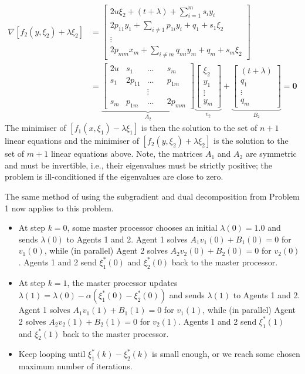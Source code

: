 \documentclass[12pt]{article}
\begin{document}
\begin{align*}
\nabla [f_2(y,\xi_2)+\lambda\xi_2]&=\begin{bmatrix}2u\xi_2+(t+\lambda)+\sum\limits_{i=1}^m s_iy_i\\2p_{11}y_1+\sum\limits_{i\neq1} p_{1i}y_i+q_1+s_1\xi_2\\ \vdots\\ 2p_{mm}x_m+\sum\limits_{i\neq m} q_{mi}y_m+q_m+s_m\xi_2\end{bmatrix}\\
&=\underbrace{\begin{bmatrix}2u&s_1&...&&s_m\\ s_1&2p_{11}&...&&p_{1m}\\&&\vdots\\ s_m&p_{1m}&...&&2p_{mm}\end{bmatrix}}_{A_2} \underbrace{\begin{bmatrix}\xi_2\\y_1\\ \vdots\\ y_m\end{bmatrix}}_{v_2}+\underbrace{\begin{bmatrix}(t+\lambda)\\q_1\\ \vdots\\ q_m\end{bmatrix}}_{B_2}=\textbf{0}
\end{align*}
The minimiser of $[f_1(x,\xi_1)-\lambda\xi_1]$ is then the solution to the set of $n+1$ linear equations and the minimiser of $[f_2(y,\xi_2)+\lambda\xi_2]$ is the solution to the set of $m+1$ linear equations above. Note, the matrices $A_1$  and $A_2$ are symmetric and must be invertible, i.e., their eigenvalues must be strictly positive; the problem is ill-conditioned if the eigenvalues are close to zero.

The same method of using the subgradient and dual decomposition from Problem 1 now applies to this problem.
\begin{itemize}
	\item At step $k=0$, some master processor chooses an initial $\lambda(0)=1.0$ and sends $\lambda(0)$ to Agents 1 and 2. Agent 1 solves $A_1v_1(0)+B_1(0)=0$ for $v_1(0)$, while (in parallel) Agent 2 solves $A_2v_2(0)+B_2(0)=0$ for $v_2(0)$. Agents 1 and 2 send $\xi_1^*(0)$ and $\xi_2^*(0)$ back to the master processor.
	\item At step $k=1$, the master processor updates $\lambda(1)=\lambda(0)-\alpha(\xi_1^*(0)-\xi_2^*(0))$ and sends $\lambda(1)$ to Agents 1 and 2. Agent 1 solves $A_1v_1(1)+B_1(1)=0$ for $v_1(1)$, while (in parallel) Agent 2 solves $A_2v_2(1)+B_2(1)=0$ for $v_2(1)$. Agents 1 and 2 send $\xi_1^*(1)$ and $\xi_2^*(1)$ back to the master processor.
	\item Keep looping until $\xi_1^*(k)-\xi_2^*(k)$ is small enough, or we reach some chosen maximum number of iterations.
\end{itemize}
\end{document}
